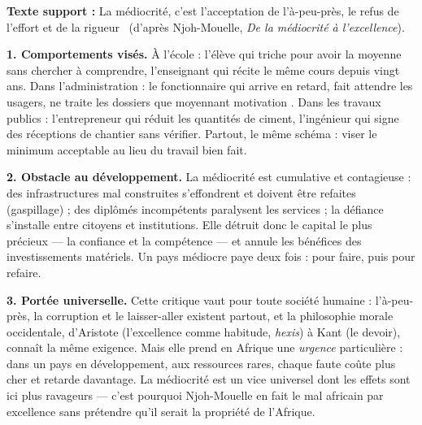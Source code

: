 \documentclass[11pt]{article}
\begin{document}
\begin{corrige}

\textbf{Texte support :} \guillemotleft La médiocrité, c'est l'acceptation de l'à-peu-près, le refus de l'effort et de la rigueur \guillemotright\ (d'après Njoh-Mouelle, \emph{De la médiocrité à l'excellence}).

\textbf{1. Comportements visés.} À l'école : l'élève qui triche pour \guillemotleft avoir la moyenne \guillemotright sans chercher à comprendre, l'enseignant qui récite le même cours depuis vingt ans. Dans l'administration : le fonctionnaire qui arrive en retard, fait attendre les usagers, ne traite les dossiers que moyennant \guillemotleft motivation \guillemotright. Dans les travaux publics : l'entrepreneur qui réduit les quantités de ciment, l'ingénieur qui signe des réceptions de chantier sans vérifier. Partout, le même schéma : viser le minimum acceptable au lieu du travail bien fait.

\textbf{2. Obstacle au développement.} La médiocrité est cumulative et contagieuse : des infrastructures mal construites s'effondrent et doivent être refaites (gaspillage) ; des diplômés incompétents paralysent les services ; la défiance s'installe entre citoyens et institutions. Elle détruit donc le capital le plus précieux — la confiance et la compétence — et annule les bénéfices des investissements matériels. Un pays médiocre paye deux fois : pour faire, puis pour refaire.

\textbf{3. Portée universelle.} Cette critique vaut pour toute société humaine : l'à-peu-près, la corruption et le laisser-aller existent partout, et la philosophie morale occidentale, d'Aristote (l'excellence comme habitude, \emph{hexis}) à Kant (le devoir), connaît la même exigence. Mais elle prend en Afrique une \emph{urgence} particulière : dans un pays en développement, aux ressources rares, chaque faute coûte plus cher et retarde davantage. La médiocrité est un vice universel dont les effets sont ici plus ravageurs — c'est pourquoi Njoh-Mouelle en fait le \guillemotleft mal africain \guillemotright par excellence sans prétendre qu'il serait la propriété de l'Afrique.
\end{corrige}
\end{document}
